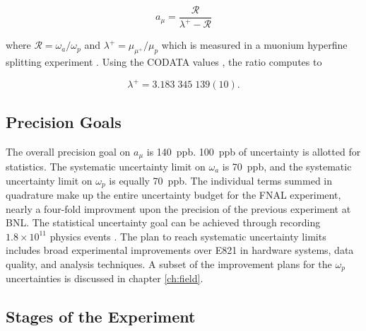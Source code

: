 \begin{equation}
\label{eqn:g-2-result-2}
a_\mu = \frac{\mathcal{R}}{\lambda^+ - \mathcal{R}}
\end{equation}

\noindent
where $\mathcal{R} = \omega_a / \omega_p$ and $\lambda^+ = \mu_{\mu^+} / \mu_p$  which is measured in a muonium hyperfine splitting experiment \cite{muonium-hyperfine}.  Using the CODATA values \cite{codata}, the ratio computes to

\begin{equation}
\label{eqn:muon-to-proton-mu-ratio}
\lambda^+ = 3.183\;345\;139(10).
\end{equation}




\subsection{Precision Goals}

The overall precision goal on $a_\mu$ is \SI{140}{ppb}.  \SI{100}{ppb} of uncertainty is allotted for statistics.  The systematic uncertainty limit on $\omega_a$ is \SI{70}{ppb}, and the systematic uncertainty limit on $\omega_p$ is equally \SI{70}{ppb}.  The individual terms summed in quadrature make up the entire uncertainty budget for the FNAL \mugmtwo experiment, nearly a four-fold improvment upon the precision of the previous experiment at BNL.  The statistical uncertainty goal can be achieved through recording $1.8\times10^{11}$ physics events \cite{e989-tdr}.  The plan to reach systematic uncertainty limits includes broad experimental improvements over E821 in hardware systems, data quality, and analysis techniques.  A subset of the improvement plans for the $\omega_p$ uncertainties is discussed in chapter \ref{ch:field}.

\subsection{Stages of the Experiment}

